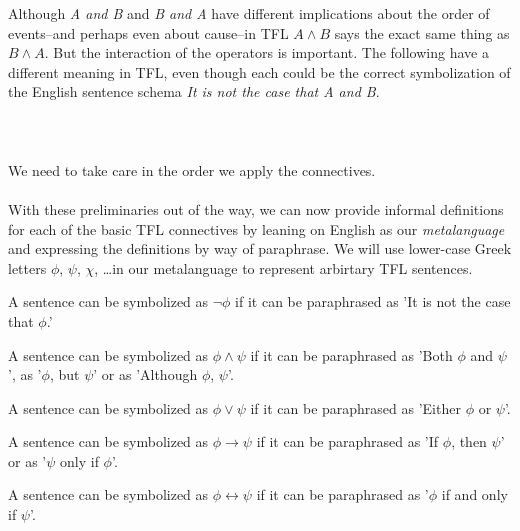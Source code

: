 Although \textit{A and B} and \textit{B and A} have different implications
about the order of events--and perhaps even about cause--in TFL $A \land B$
says the exact same thing as $B \land A$. But the interaction of the operators
is important. The following have a different meaning in TFL, even though each
could be the correct symbolization of the English sentence schema \textit{It
  is not the case that A and B}.
\\
\\
\\
\\
We need to take care in the order we apply the connectives.
\\
\\
With these preliminaries out of the way, we can now provide informal
definitions for each of the basic TFL connectives by leaning on English
as our \textit{metalanguage} and expressing the definitions by way of
paraphrase. We will use lower-case Greek letters $\phi$, $\psi$, $\chi$,
\dots in our metalanguage to represent arbirtary TFL sentences.

\begin{definition}[Negation]
  A sentence can be symbolized as $\lnot \phi$ if it can be paraphrased as
  'It is not the case that $\phi$.'
\end{definition}

\begin{definition}[Conjunction]
  A sentence can be symbolized as $\phi\land\psi$ if it can be paraphrased as
  'Both $\phi$ and $\psi$', as '$\phi$, but $\psi$' or as 'Although $\phi$,
  $\psi$'.
\end{definition}

\begin{definition}[Disjunction]
  A sentence can be symbolized as $\phi\lor\psi$ if it can be paraphrased as
  'Either $\phi$ or $\psi$'.
\end{definition}

\begin{definition}[Conditional]
  A sentence can be symbolized as $\phi\rightarrow\psi$ if it can be
  paraphrased as 'If $\phi$, then $\psi$' or as '$\psi$ only if $\phi$'.
\end{definition}

\begin{definition}[Biconditional]
  A sentence can be symbolized as $\phi\leftrightarrow\psi$ if it can be
  paraphrased as '$\phi$ if and only if $\psi$'.
\end{definition}
